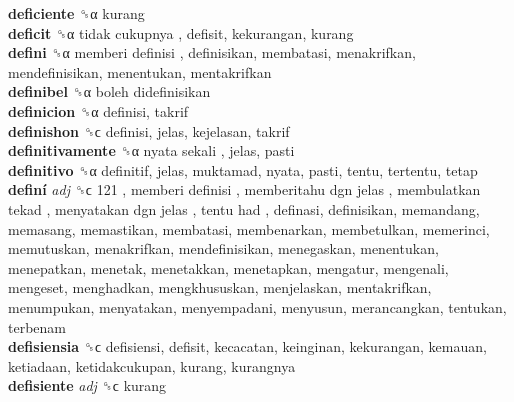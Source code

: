 \textbf{deficiente} ␝α  kurang  \\
\textbf{deficit} ␝α   tidak cukupnya , defisit, kekurangan, kurang  \\
\textbf{defini} ␝α   memberi definisi , definisikan, membatasi, menakrifkan, mendefinisikan, menentukan, mentakrifkan  \\
\textbf{definibel} ␝α   boleh didefinisikan   \\
\textbf{definicion} ␝α  definisi, takrif  \\
\textbf{definishon} ␝ϲ  definisi, jelas, kejelasan, takrif  \\
\textbf{definitivamente} ␝α   nyata sekali , jelas, pasti  \\
\textbf{definitivo} ␝α  definitif, jelas, muktamad, nyata, pasti, tentu, tertentu, tetap  \\
\textbf{definí} \emph{adj}  ␝ϲ   121 ,  memberi definisi ,  memberitahu dgn jelas ,  membulatkan tekad ,  menyatakan dgn jelas ,  tentu had , definasi, definisikan, memandang, memasang, memastikan, membatasi, membenarkan, membetulkan, memerinci, memutuskan, menakrifkan, mendefinisikan, menegaskan, menentukan, menepatkan, menetak, menetakkan, menetapkan, mengatur, mengenali, mengeset, menghadkan, mengkhususkan, menjelaskan, mentakrifkan, menumpukan, menyatakan, menyempadani, menyusun, merancangkan, tentukan, terbenam  \\
\textbf{defisiensia} ␝ϲ  defisiensi, defisit, kecacatan, keinginan, kekurangan, kemauan, ketiadaan, ketidakcukupan, kurang, kurangnya  \\
\textbf{defisiente} \emph{adj}  ␝ϲ  kurang  \\
